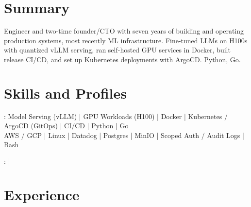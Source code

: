 \documentclass[print]{jack-resume}
\begin{document}
\pagecolor{darkmodeBackground}


\begin{minipage}[t][1cm][t]{.03\textwidth}
    \hfill
\end{minipage}

\section{Summary}
Engineer and two-time founder/CTO with seven years of building and operating production systems, most recently ML infrastructure. Fine-tuned LLMs on H100s with quantized vLLM serving, ran self-hosted GPU services in Docker, built release CI/CD, and set up Kubernetes deployments with ArgoCD. Python, Go.
\sectionsep

\section{Skills and Profiles}
:
Model Serving (vLLM) \hfill | \hfill
GPU Workloads (H100) \hfill | \hfill
Docker \hfill | \hfill
Kubernetes / ArgoCD (GitOps) \hfill | \hfill
CI/CD \hfill | \hfill
Python \hfill | \hfill
Go \\
\hspace{1.0cm} AWS / GCP \hfill | \hfill
Linux \hfill | \hfill
Datadog \hfill | \hfill
Postgres \hfill | \hfill
MinIO \hfill | \hfill
Scoped Auth / Audit Logs \hfill | \hfill
Bash \\

\raggedright{
    :
      \href{https://www.linkedin.com/in/jack-sturtevant/}{ \ExternalLink} |
     \href{https://github.com/jacksturt}{ \ExternalLink}}

\section{Experience}
\end{document}

